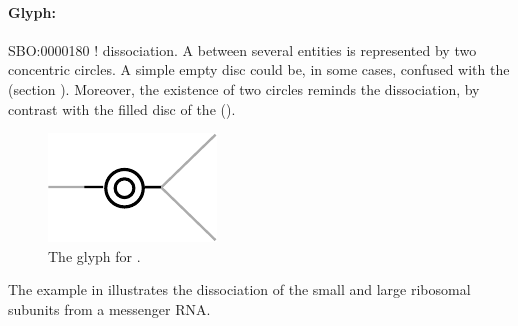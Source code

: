 

\paragraph{Glyph: }\label{sec:techref:dissociation}

\begin{glyphDescription}
 \glyphSboTerm SBO:0000180 ! dissociation.
 \glyphNode A  between several entities is represented by two concentric circles. A simple empty disc could be, in some cases, confused with the  (section ). Moreover, the existence of two circles reminds the dissociation, by contrast with the filled disc of the  ().
 \end{glyphDescription}


\begin{figure}[htb]
  \centering
  \includegraphics[scale = 0.5]{images/dissociation}
  \caption{The \PD glyph for .}
  \label{fig:techref:dissociation}
\end{figure}

The example in  illustrates the dissociation of the small and large ribosomal subunits from a messenger RNA.


